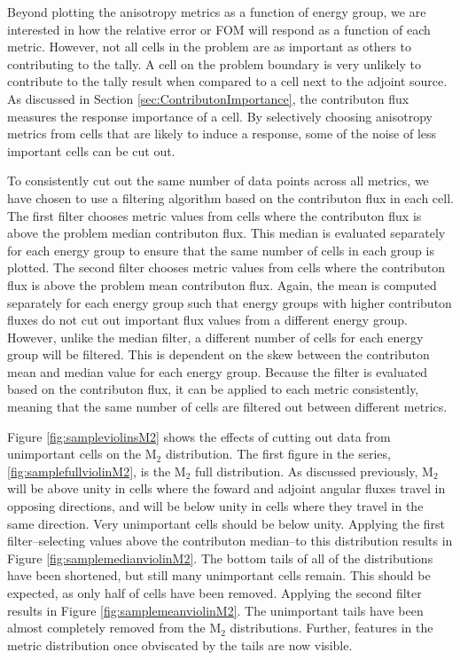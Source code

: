 

Beyond plotting the anisotropy metrics as a function of energy group, we are
interested in how the relative error or FOM will respond as a function of each
metric. However, not all cells in the problem are as important as others to
contributing to the tally. A cell on the problem boundary is very unlikely to
contribute to the tally result when compared to a cell next to the adjoint
source. As discussed in Section \ref{sec:ContributonImportance}, the contributon
flux measures the response importance of a cell. By selectively choosing
anisotropy metrics from cells that are likely to induce a response, some of the noise
of less important cells can be cut out.

To consistently cut out the same number of data points across all metrics, we
have chosen to use a filtering algorithm based on the contributon flux in each
cell. The first filter chooses metric values from cells where the
contributon flux is above the problem median contributon flux. This median is
evaluated separately for each energy group to ensure that the same number of
cells in each group is plotted. The second filter chooses metric values from
cells where the contributon flux is above the problem mean contributon flux.
Again, the mean is computed separately for each energy group such that energy
groups with higher contributon fluxes do not cut out important flux values from
a different energy group. However, unlike the median filter, a different number
of cells for each energy group will be filtered. This is dependent on the skew
between the contributon mean and median value for each energy group.
Because the filter is evaluated based on the
contributon flux, it can be applied to each metric consistently, meaning that
the same number of cells are filtered out between different metrics.

Figure \ref{fig:sampleviolinsM2} shows the effects of cutting out data from
unimportant cells on the M$_2$ distribution. The first figure in the series,
\ref{fig:samplefullviolinM2}, is the M$_2$ full distribution. As discussed
previously, M$_2$ will be above unity in cells where the foward and adjoint
angular fluxes travel in opposing directions, and will be below unity in cells
where they travel in the same direction. Very unimportant cells should be below
unity. Applying the first filter--selecting values above the contributon
median--to this distribution results in Figure \ref{fig:samplemedianviolinM2}.
The bottom tails of all of the distributions have been shortened, but still many
unimportant cells remain. This should be expected, as only half of cells have
been removed. Applying the second filter results in Figure
\ref{fig:samplemeanviolinM2}. The unimportant tails have been almost completely
removed from the M$_2$ distributions. Further, features in the metric
distribution once obviscated by the
tails are now visible.

